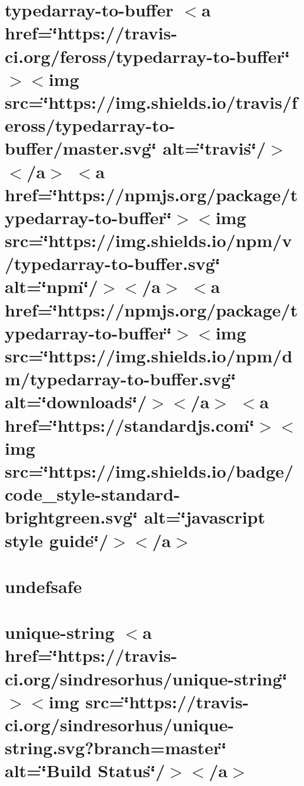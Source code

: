 \let\mypdfximage\pdfximage\def\pdfximage{\immediate\mypdfximage}\documentclass[twoside]{book}
\newcommand{\+}{\discretionary{\mbox{\scriptsize$\hookleftarrow$}}{}{}}
\begin{document}
\chapter{typedarray-\/to-\/buffer $<$a href=\char`\"{}https\+://travis-\/ci.\+org/feross/typedarray-\/to-\/buffer\char`\"{}$>$$<$img src=\char`\"{}https\+://img.\+shields.\+io/travis/feross/typedarray-\/to-\/buffer/master.\+svg\char`\"{} alt=\char`\"{}travis\char`\"{}/$>$$<$/a$>$ $<$a href=\char`\"{}https\+://npmjs.\+org/package/typedarray-\/to-\/buffer\char`\"{}$>$$<$img src=\char`\"{}https\+://img.\+shields.\+io/npm/v/typedarray-\/to-\/buffer.\+svg\char`\"{} alt=\char`\"{}npm\char`\"{}/$>$$<$/a$>$ $<$a href=\char`\"{}https\+://npmjs.\+org/package/typedarray-\/to-\/buffer\char`\"{}$>$$<$img src=\char`\"{}https\+://img.\+shields.\+io/npm/dm/typedarray-\/to-\/buffer.\+svg\char`\"{} alt=\char`\"{}downloads\char`\"{}/$>$$<$/a$>$ $<$a href=\char`\"{}https\+://standardjs.\+com\char`\"{}$>$$<$img src=\char`\"{}https\+://img.\+shields.\+io/badge/code\+\_\+style-\/standard-\/brightgreen.\+svg\char`\"{} alt=\char`\"{}javascript style guide\char`\"{}/$>$$<$/a$>$}
\label{md__c_1__git_hub__p_r_o_y_e_c_t_o-_i_i_i-_g_o_t_rest-api_node_modules_typedarray-to-buffer__r_e_a_d_m_e}

\chapter{undefsafe}
\label{md__c_1__git_hub__p_r_o_y_e_c_t_o-_i_i_i-_g_o_t_rest-api_node_modules_undefsafe__r_e_a_d_m_e}

\chapter{unique-\/string $<$a href=\char`\"{}https\+://travis-\/ci.\+org/sindresorhus/unique-\/string\char`\"{}$>$$<$img src=\char`\"{}https\+://travis-\/ci.\+org/sindresorhus/unique-\/string.\+svg?branch=master\char`\"{} alt=\char`\"{}\+Build Status\char`\"{}/$>$$<$/a$>$}
\label{md__c_1__git_hub__p_r_o_y_e_c_t_o-_i_i_i-_g_o_t_rest-api_node_modules_unique-string_readme}

\end{document}
